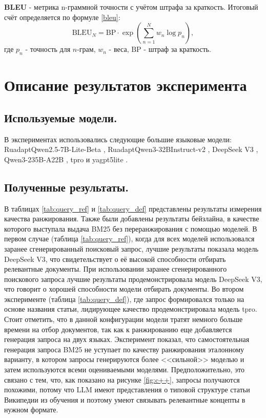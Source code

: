 \documentclass{article}
\begin{document}
\textbf{BLEU} \cite{bleu} - метрика n-граммной точности с учётом штрафа за краткость. Итоговый счёт определяется по формуле \eqref{bleu}:
\begin{equation}\label{bleu}
\mathrm{BLEU}_N = \mathrm{BP}\cdot \exp\!\left(\sum_{n=1}^{N} w_n \log p_n\right),
\end{equation}
где \(p_n\) - точность для \(n\)-грам, \(w_n\) - веса, $\mathrm{BP}$ - штраф за краткость.

\section*{Описание результатов эксперимента}
\subsection*{Используемые модели.}
В экспериментах использовались следующие большие языковые модели: 
RuadaptQwen2.5-\allowbreak 7B-\allowbreak Lite-\allowbreak Beta \cite{ruadapt},
RuadaptQwen3-\allowbreak 32BInstruct-v2 \cite{ruadapt}, 
DeepSeek V3 \cite{deepseek}, 
Qwen3-\allowbreak 235B-\allowbreak A22B \cite{qwen3}, 
tpro \cite{tpro} и yagpt5lite \cite{yagpt}.

\subsection*{Полученные результаты.}
В таблицах \ref{tab:query_ref} и \ref{tab:query_def} представлены результаты измерения качества ранжирования. 
Также были добавлены результаты бейзлайна, в качестве которого выступала выдача BM25 без переранжирования с помощью моделей. 
В первом случае (таблица \ref{tab:query_ref}), когда для всех моделей использовался заранее сгенерированный поисковый запрос, 
лучшие результаты показала модель DeepSeek V3, что свидетельствует о её высокой способности отбирать релевантные документы.
При использовании заранее сгенерированного поискового запроса лучшие результаты продемонстрировала модель DeepSeek V3, что говорит о хорошей способности модели отбирать документы.
Во втором эксперименте (таблица \ref{tab:query_def}), где запрос формировался только на основе названия статьи, лидирующее качество продемонстрировала модель tpro. 
Стоит отметить, что в данной конфигурации модели тратят немного больше времени на отбор документов, так как к ранжированию еще добавляется генерация запроса на двух языках.
Эксперимент показал, что самостоятельная генерация запроса BM25 не уступает по качеству ранжирования эталонному варианту, в котором запросы генерируются более <<сильной>> моделью и затем
используются всеми оцениваемыми моделями. Предположительно, это связано с тем, что, как показано на рисунке \ref{fig:c++}, запросы получаются похожими, потому что
LLM имеют представления о типовой структуре статьи Википедии из обучения и поэтому умеют связывать релевантные концепты в нужном формате.
\end{document}
